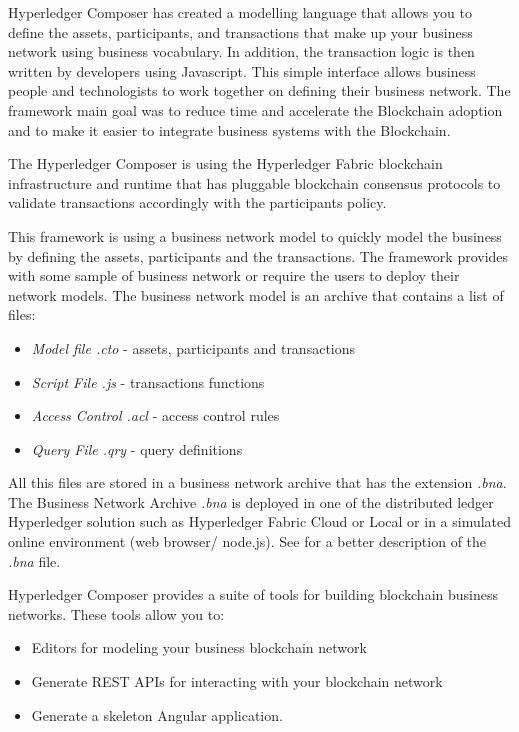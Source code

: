 Hyperledger Composer has created a modelling language that allows you to define the assets, participants, and transactions that make up your business network using business vocabulary. In addition, the transaction logic is then written by developers using Javascript. This simple interface allows business people and technologists to work together on defining their business network.
The framework main goal was to reduce time and accelerate the Blockchain adoption and to make it easier to integrate business systems with the Blockchain.

The Hyperledger Composer is using the Hyperledger Fabric blockchain infrastructure and runtime that has pluggable blockchain consensus protocols to validate transactions  accordingly with the participants policy.

This framework is using a business network model to quickly model the business by defining the assets, participants and the transactions. The framework provides with some sample of business network or require the users to deploy their network models.
The business network model is an archive that contains a list of files:
\begin{itemize}
	\item \emph{Model file .cto} - assets, participants and transactions
	\item \emph{Script File .js} - transactions functions
	\item \emph{Access Control .acl} - access control rules
	\item \emph{Query File .qry} - query definitions
\end{itemize}
All this files are stored in a business network archive that has the extension \emph{.bna}.
The Business Network Archive \emph{.bna} is deployed in one of the distributed ledger Hyperledger solution such as Hyperledger Fabric Cloud or Local or in a simulated online environment (web browser/ node.js). See  for a better description of the \emph{.bna} file. 


Hyperledger Composer provides a suite of tools for building blockchain business networks. These tools allow you to:
\begin{itemize}
	\item Editors for modeling your business blockchain network
	\item Generate REST APIs for interacting with your blockchain network
	\item Generate a skeleton Angular application.
\end{itemize}

